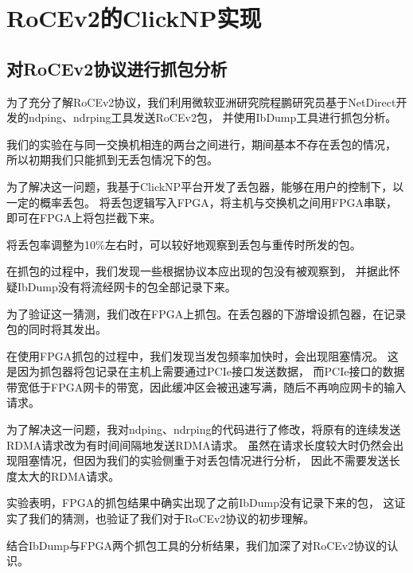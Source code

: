 \chapter{RoCEv2的ClickNP实现}
\section{对RoCEv2协议进行抓包分析}
为了充分了解RoCEv2协议，我们利用微软亚洲研究院程鹏研究员基于NetDirect开发的ndping、ndrping工具发送RoCEv2包，
并使用IbDump工具进行抓包分析。

我们的实验在与同一交换机相连的两台之间进行，期间基本不存在丢包的情况，
所以初期我们只能抓到无丢包情况下的包。

为了解决这一问题，我基于ClickNP平台开发了丢包器，能够在用户的控制下，以一定的概率丢包。
将丢包逻辑写入FPGA，将主机与交换机之间用FPGA串联，即可在FPGA上将包拦截下来。

将丢包率调整为10\%左右时，可以较好地观察到丢包与重传时所发的包。

在抓包的过程中，我们发现一些根据协议本应出现的包没有被观察到，
并据此怀疑IbDump没有将流经网卡的包全部记录下来。

为了验证这一猜测，我们改在FPGA上抓包。在丢包器的下游增设抓包器，在记录包的同时将其发出。

在使用FPGA抓包的过程中，我们发现当发包频率加快时，会出现阻塞情况。
这是因为抓包器将包记录在主机上需要通过PCIe接口发送数据，
而PCIe接口的数据带宽低于FPGA网卡的带宽，因此缓冲区会被迅速写满，随后不再响应网卡的输入请求。

为了解决这一问题，我对ndping、ndrping的代码进行了修改，将原有的连续发送RDMA请求改为有时间间隔地发送RDMA请求。
虽然在请求长度较大时仍然会出现阻塞情况，但因为我们的实验侧重于对丢包情况进行分析，
因此不需要发送长度太大的RDMA请求。

实验表明，FPGA的抓包结果中确实出现了之前IbDump没有记录下来的包，
这证实了我们的猜测，也验证了我们对于RoCEv2协议的初步理解。

结合IbDump与FPGA两个抓包工具的分析结果，我们加深了对RoCEv2协议的认识。
